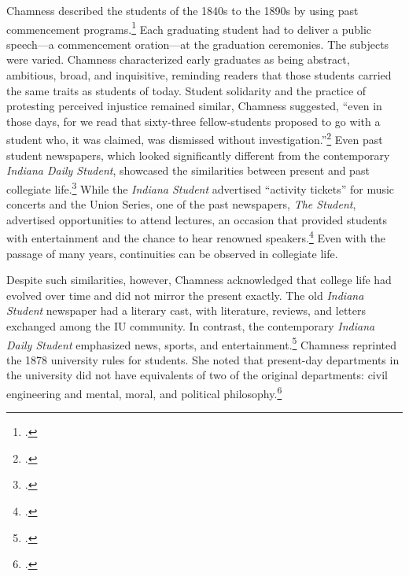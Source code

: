\documentclass[
  american,
  letterpaper,
]{scrreprt}
\begin{document}
Chamness described the students of the 1840s to the 1890s by using past
commencement programs.\footnote{.} Each graduating student had to
deliver a public speech---a commencement oration---at the graduation
ceremonies. The subjects were varied. Chamness characterized early
graduates as being abstract, ambitious, broad, and inquisitive,
reminding readers that those students carried the same traits as
students of today. Student solidarity and the practice of protesting
perceived injustice remained similar, Chamness suggested, ``even in
those days, for we read that sixty-three fellow-students proposed to go
with a student who, it was claimed, was dismissed without
investigation.''\footnote{.} Even past student newspapers, which looked
significantly different from the contemporary \emph{Indiana Daily
Student}, showcased the similarities between present and past collegiate
life.\footnote{.} While the
\emph{Indiana Student} advertised ``activity tickets'' for music
concerts and the Union Series, one of the past newspapers, \emph{The
Student}, advertised opportunities to attend lectures, an occasion that
provided students with entertainment and the chance to hear renowned
speakers.\footnote{.} Even with the
passage of many years, continuities can be observed in collegiate life.

Despite such similarities, however, Chamness acknowledged that college
life had evolved over time and did not mirror the present exactly. The
old \emph{Indiana Student} newspaper had a literary cast, with
literature, reviews, and letters exchanged among the IU community. In
contrast, the contemporary \emph{Indiana Daily Student} emphasized news,
sports, and entertainment.\footnote{.} Chamness
reprinted the 1878 university rules for students. She noted that
present-day departments in the university did not have equivalents of
two of the original departments: civil engineering and mental, moral,
and political philosophy.\footnote{.}
\end{document}
